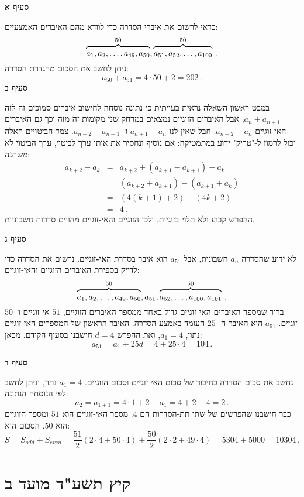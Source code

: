 \textbf{סעיף א}

כדאי לרשום את איברי הסדרה כדי לוודא מהם האיברים האמצעיים:
\[
\overbrace{\rule{0pt}{8pt}a_1, a_2, \ldots, a_{49}, a_{50}}^{50}, \overbrace{\rule{0pt}{8pt}a_{51}, a_{52},\ldots, a_{100}}^{50}\,.
\]
ניתן לחשב את הסכום מהגדרת הסדרה:
\[
a_{50}+a_{51}=4\cdot 50+2=202\,.
\]
\textbf{סעיף ב}

במבט ראשון השאלה נראית בעייתית כי נתונה נוסחה לחישוב איברים סמוכים זה לזה
$a_n+a_{n+1}$,
אבל האיברים הזוגיים נמצאים במרחק שני מקומות זה מזה וכך גם האיברים האי-זוגיים
$a_{n+2}-a_{n}$.
חבל שאין לנו
$a_{n+1}-a_{n}$
ו-%
$a_{n+2}-a_{n+1}$.
צמד הביטויים האלה יכול לרמוז ל-"טריק" ידוע במתמטיקה: אם נוסיף ונחסיר את אותו ערך לביטוי, ערך הביטוי לא משתנה:
\begin{eqnarray*}
a_{k+2} - a_{k} &=& a_{k+2}+(a_{k+1}-a_{k+1})-a_{k}\\
&=& (a_{k+2}+a_{k+1})-(a_{k+1}+a_{k})\\
&=& (4(k+1)+2)-(4k+2)\\
&=&4\,.
\end{eqnarray*}
ההפרש קבוע ולא תלוי בזוגיות, ולכן הזוגיים והאי-זוגיים מהווים סדרות חשבוניות.

\np

\textbf{סעיף ג}

לא ידוע שהסדרה
$a_{n}$
חשבונית, אבל
$a_{51}$
הוא איבר בסדרת
\textbf{האי-זוגיים}.
נרשום את הסדרה כדי לדייק בספירת האיברים הזוגיים והאי-זוגיים:
\[
\overbrace{\rule{0pt}{8pt}a_1, a_2, \ldots, a_{49}, a_{50}}^{50}, a_{51}, \overbrace{\rule{0pt}{8pt}a_{52}, \ldots, a_{100}, a_{101}}^{50}\,.
\]
ברור שמספר האיברים האי-זוגיים גדול באחד ממספר האיברים הזוגיים,
$51$
אי-זוגיים ו-%
$50$
זוגיים. 
$a_{51}$
הוא האיבר ה-%
$25$
העומד באמצע הסדרה. האיבר הראשון של המספרים האי-זוגיים נתון,
$a_1=4$,
ואת ההפרש
$d=4$
חישבנו בסעיף הקודם. מכאן:
\[
a_{51}=a_1+25d =4+25\cdot 4=104\,.
\]

\textbf{סעיף ד}

נחשב את סכום הסדרה כחיבור של סכום האי-זוגיים וסכום הזוגיים.
$a_1=4$
נתון, וניתן לחשב לפי הנוסחה הנתונה:
\[
a_2=a_{1+1}=4\cdot 1+2-a_1=4+2-4=2\,.
\]
כבר חישבנו שהפרשים של שתי תת-הסדרות הם 
$4$.
מספר האי-זוגיים הוא
$51$
ומספר הזוגיים הוא
$50$.
הסכום הוא:
\[
S=S_{\mathit{odd}} + S_{\mathit{even}}=\frac{51}{2}(2\cdot 4+50\cdot 4)+\frac{50}{2}(2\cdot 2+49\cdot 4)=5304+5000=10304\,.
\]

\np

\section{קיץ תשע"ד מועד ב}

